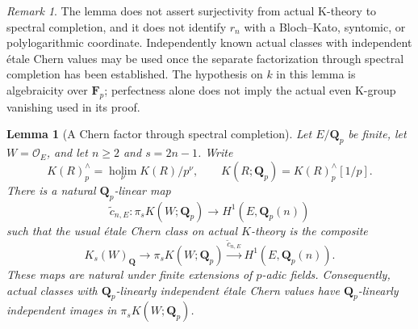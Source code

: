 \documentclass[11pt,a4paper]{article}
\newtheorem{lemma}[theorem]{Lemma}
\theoremstyle{remark}
\newtheorem{remark}[theorem]{Remark}
\newcommand{\Q}{\mathbf Q}
\begin{document}
\begin{remark}
The lemma does not assert surjectivity from actual K-theory to
spectral completion, and it does not identify $r_n$ with a
Bloch--Kato, syntomic, or polylogarithmic coordinate. Independently
known actual classes with independent \'etale Chern values may be
used once the separate factorization through spectral completion
has been established. The hypothesis on $k$ in this lemma is
algebraicity over $\mathbf F_p$; perfectness alone does not imply
the actual even K-group vanishing used in its proof.
\end{remark}


\begin{lemma}[A Chern factor through spectral completion]
\label{lem:cherncompletionfactor}
Let $E/\Q_p$ be finite, let $W=\mathcal O_E$, and let
$n\geq2$ and $s=2n-1$. Write
\[
 K(R)^{\wedge}_p=\operatorname*{holim}_{\nu}K(R)/p^\nu,
 \qquad K(R;\Q_p)=K(R)^{\wedge}_p[1/p].
\]
There is a natural $\Q_p$-linear map
\[
 \widetilde c_{n,E}:\pi_sK(W;\Q_p)
             \longrightarrow H^1(E,\Q_p(n))
\]
such that the usual \'etale Chern class on actual $K$-theory is
the composite
\[
 K_s(W)_{\Q}\longrightarrow\pi_sK(W;\Q_p)
       \xrightarrow{\widetilde c_{n,E}}H^1(E,\Q_p(n)).
\]
These maps are natural under finite extensions of $p$-adic fields.
Consequently, actual classes with $\Q_p$-linearly independent
\'etale Chern values have $\Q_p$-linearly independent images in
$\pi_sK(W;\Q_p)$.
\end{lemma}
\end{document}
